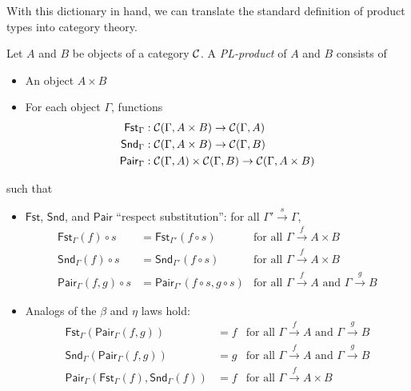 With this dictionary in hand, we can translate the standard definition of product types into category theory.

\begin{definition}
  \sloppy
  Let \(A\) and \(B\) be objects of a category \(\mathcal C\).
  A \emph{PL-product} of \(A\) and \(B\) consists of
  \begin{itemize}
  \item An object \(A \times B\)
  \item For each object \(\Gamma\), functions
    \begin{align*}
      \mathsf{Fst}_\Gamma &: \mathcal C(\Gamma,A\times B) \to \mathcal C(\Gamma,A) \\
      \mathsf{Snd}_\Gamma &: \mathcal C(\Gamma,A\times B) \to \mathcal C(\Gamma,B) \\
      \mathsf{Pair}_\Gamma &: \mathcal C(\Gamma,A)\times\mathcal C(\Gamma,B) \to \mathcal C(\Gamma,A\times B)
    \end{align*}
  \end{itemize}
  such that
  \begin{itemize}
  \item \(\mathsf{Fst}\), \(\mathsf{Snd}\), and \(\mathsf{Pair}\) ``respect substitution'': for all
    \(\Gamma'\xrightarrow{s}\Gamma\),
    \begin{align*}
      \mathsf{Fst}_{\Gamma}(f)\circ s &= \mathsf{Fst}_{\Gamma'}(f \circ s) & \text{for all \(\Gamma\xrightarrow{f} A \times B\)} \\
      \mathsf{Snd}_{\Gamma}(f)\circ s &= \mathsf{Snd}_{\Gamma'}(f \circ s) & \text{for all \(\Gamma\xrightarrow{f} A \times B\)} \\
      \mathsf{Pair}_{\Gamma}(f,g)\circ s &= \mathsf{Pair}_{\Gamma'}(f \circ s,g\circ s) & \text{for all \(\Gamma\xrightarrow{f} A\) and \(\Gamma\xrightarrow{g} B\)}
    \end{align*}
  \item Analogs of the \(\beta\) and \(\eta\) laws hold:
    \begin{align*}
      \mathsf{Fst}_{\Gamma}(\mathsf{Pair}_{\Gamma}(f,g)) &= f   & \text{for all \(\Gamma\xrightarrow{f} A\) and \(\Gamma\xrightarrow{g} B\)} \\
      \mathsf{Snd}_{\Gamma}(\mathsf{Pair}_{\Gamma}(f,g)) &= g   & \text{for all \(\Gamma\xrightarrow{f} A\) and \(\Gamma\xrightarrow{g} B\)} \\
      \mathsf{Pair}_\Gamma(\mathsf{Fst}_\Gamma(f),\mathsf{Snd}_\Gamma(f)) &= f   & \text{for all \(\Gamma\xrightarrow{f} A\times B\)}
    \end{align*}
  \end{itemize}
\end{definition}


